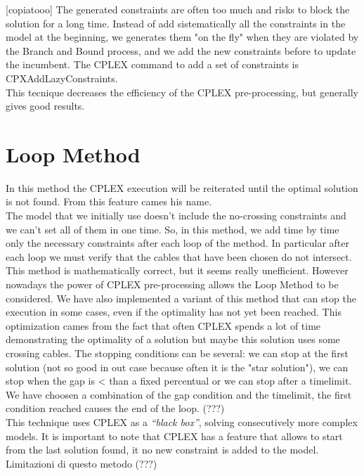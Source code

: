 [copiatooo]
The generated constraints are often too much and risks to block the solution for a long time. 
Instead of add sistematically all the constraints in the model at the beginning, we generates them "on the fly" when they are violated by the Branch and Bound process, and we add the new constraints before to update the incumbent. The \textsc{CPLEX} command to add a set of constraints is CPXAddLazyConstraints. \\
This tecnique decreases the efficiency of the \textsc{CPLEX} pre-processing, but generally gives good results.

\section{Loop Method}
In this method the \textsc{CPLEX} execution will be reiterated until the optimal solution is not found. From this feature cames his name. \\
The model that we initially use doesn't include the no-crossing constraints and we can't set all of them in one time. So, in this method, we add time by time only the necessary constraints after each loop of the method. In particular after each loop we must verify that the cables that have been chosen do not intersect.\\
This method is mathematically correct, but it seems really unefficient. However nowadays the power of \textsc{CPLEX} pre-processing allows the Loop Method to be considered. We have also implemented a variant of this method that can stop the execution in some cases, even if the optimality has not yet been reached. This optimization cames from the fact that often \textsc{CPLEX} spends a lot of time demonstrating the optimality of a solution but maybe this solution uses some crossing cables. The stopping conditions can be several: we can stop at the first solution (not so good in out case because often it is the "star solution"), we can stop when the gap is < than a fixed percentual or we can stop after a timelimit. We have choosen a combination of the gap condition and the timelimit, the first condition reached causes the end of the loop. (???)\\
This technique uses \textsc{CPLEX} as a \textit{“black box”}, solving consecutively more complex models. It is important to note that \textsc{CPLEX} has a feature that allows to start from the last solution found, it no new constraint is added to the model. Limitazioni di questo metodo (???)

